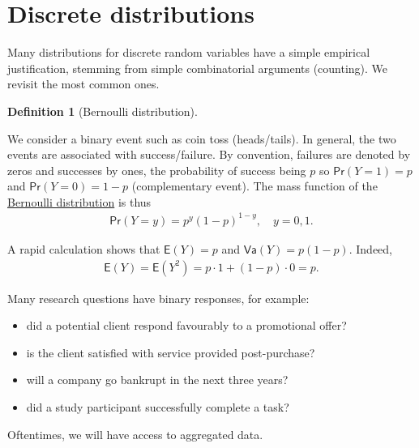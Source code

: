 \documentclass[
  11pt,
  letterpaper,
]{scrbook}
\providecommand{\tightlist}{%
  \setlength{\itemsep}{0pt}\setlength{\parskip}{0pt}}\usepackage{longtable,booktabs,array}
\theoremstyle{definition}
\newtheorem{definition}{Definition}[chapter]
\theoremstyle{definition}
\theoremstyle{plain}
\theoremstyle{remark}
\begin{document}
\section{Discrete distributions}\label{discrete-distributions}

Many distributions for discrete random variables have a simple empirical
justification, stemming from simple combinatorial arguments (counting).
We revisit the most common ones.

\begin{definition}[Bernoulli
distribution]\protect\hypertarget{def-bernoullidist}{}\label{def-bernoullidist}

We consider a binary event such as coin toss (heads/tails). In general,
the two events are associated with success/failure. By convention,
failures are denoted by zeros and successes by ones, the probability of
success being \(p\) so \(\mathsf{Pr}(Y=1)=p\) and
\(\mathsf{Pr}(Y=0)=1-p\) (complementary event). The mass function of the
\href{https://en.wikipedia.org/wiki/Bernoulli_distribution}{Bernoulli
distribution} is thus \begin{align*}
\mathsf{Pr}(Y=y) = p^y (1-p)^{1-y}, \quad y=0, 1.
\end{align*}

\end{definition}

A rapid calculation shows that \(\mathsf{E}(Y)=p\) and
\(\mathsf{Va}(Y)=p(1-p).\) Indeed, \begin{align*}
\mathsf{E}(Y) = \mathsf{E}(Y^2) = p \cdot 1 + (1-p) \cdot 0 = p.
\end{align*}

Many research questions have binary responses, for example:

\begin{itemize}
\tightlist
\item
  did a potential client respond favourably to a promotional offer?
\item
  is the client satisfied with service provided post-purchase?
\item
  will a company go bankrupt in the next three years?
\item
  did a study participant successfully complete a task?
\end{itemize}

Oftentimes, we will have access to aggregated data.
\end{document}
